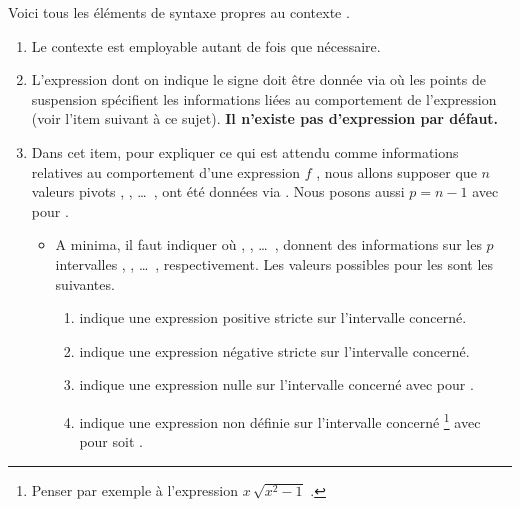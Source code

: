 Voici tous les éléments de syntaxe propres au contexte .
%
\begin{enumerate}
    \item Le contexte  est employable autant de fois que nécessaire.


    \item L'expression dont on indique le signe doit être donnée via  où les points de suspension spécifient les informations liées au comportement de l'expression (voir l'item suivant à ce sujet).
    \textbf{Il n'existe pas d'expression par défaut.}


    \item Dans cet item, pour expliquer ce qui est attendu comme informations relatives au comportement d'une expression $f$ , nous allons supposer que $n$ valeurs pivots  ,  , \dots\ ,  ont été données via  . Nous posons aussi $p = n - 1$ avec  pour  .
    \begin{itemize}
        \item A minima, il faut indiquer
        où
         ,  , \dots\ , 
        donnent des informations sur les $p$ intervalles
        \tdoclatexin{]x_1 ; x_2[} , \tdoclatexin{]x_2 ; x_3[} , \dots\ , \tdoclatexin{]x_p ; x_n[} respectivement.
        Les valeurs possibles pour les  sont les suivantes.
        \begin{enumerate}
            \item \tdoclatexin{+} indique une expression positive stricte sur l'intervalle concerné.

            \item \tdoclatexin{-} indique une expression négative stricte sur l'intervalle concerné.

            \item {} indique une expression nulle sur l'intervalle concerné avec  pour .

            \item {} indique une expression non définie sur l'intervalle concerné
            \footnote{
                Penser par exemple à l'expression $x \, \sqrt{x^2 - 1}$ .
            }
            avec  pour  soit .
        \end{enumerate}



\end{itemize}
\end{enumerate}
